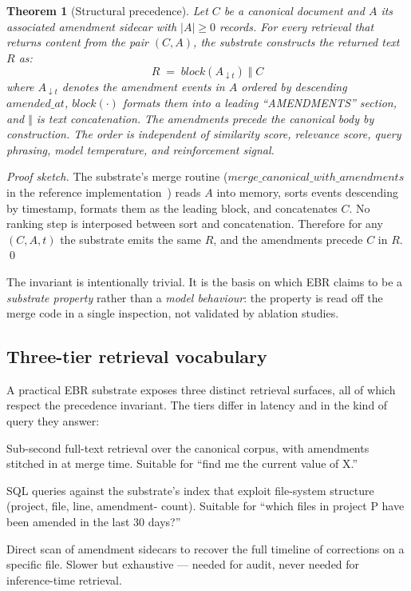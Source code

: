 \documentclass[11pt,a4paper]{article}
\newtheorem{theorem}{Theorem}
\begin{document}
\begin{theorem}[Structural precedence]
\label{thm:precedence}
Let $C$ be a canonical document and $A$ its associated amendment sidecar with $|A| \geq 0$
records. For every retrieval that returns content from the pair $(C, A)$, the substrate
constructs the returned text $R$ as:
\[
R \;=\; \mathit{block}(A_{\downarrow t}) \;\Vert\; C
\]
where $A_{\downarrow t}$ denotes the amendment events in $A$ ordered by descending
$\mathit{amended\_at}$, $\mathit{block}(\cdot)$ formats them into a leading
``AMENDMENTS'' section, and $\Vert$ is text concatenation.
The amendments precede the canonical body by construction. The order is independent of
similarity score, relevance score, query phrasing, model temperature, and reinforcement
signal.
\end{theorem}

\begin{proof}[Proof sketch]
The substrate's merge routine ($\mathit{merge\_canonical\_with\_amendments}$ in the
reference implementation~\cite{anthony2026ebr}) reads $A$ into memory, sorts events
descending by timestamp, formats them as the leading block, and concatenates $C$. No
ranking step is interposed between sort and concatenation. Therefore for any
$(C, A, t)$ the substrate emits the same $R$, and the amendments precede $C$ in $R$.
\qed
\end{proof}

\noindent
The invariant is intentionally trivial. It is the basis on which EBR claims to be a
\emph{substrate property} rather than a \emph{model behaviour}: the property is read off
the merge code in a single inspection, not validated by ablation studies.

\subsection{Three-tier retrieval vocabulary}
\label{sec:tiers}

\noindent
A practical EBR substrate exposes three distinct retrieval surfaces, all of which respect
the precedence invariant. The tiers differ in latency and in the kind of query they
answer:

\begin{description}[leftmargin=2em,itemsep=4pt]
  \item[Tier 1 (BM25 keyword search).] Sub-second full-text retrieval over the
        canonical corpus, with amendments stitched in at merge time. Suitable for
        ``find me the current value of X.''
  \item[Tier 1.5 (structural surface map).] SQL queries against the substrate's
        index that exploit file-system structure (project, file, line, amendment-
        count). Suitable for ``which files in project P have been amended in the
        last 30 days?''
  \item[Tier 2 (forensic JSONL scan).] Direct scan of amendment sidecars to recover
        the full timeline of corrections on a specific file. Slower but
        exhaustive --- needed for audit, never needed for inference-time retrieval.
\end{description}
\end{document}
